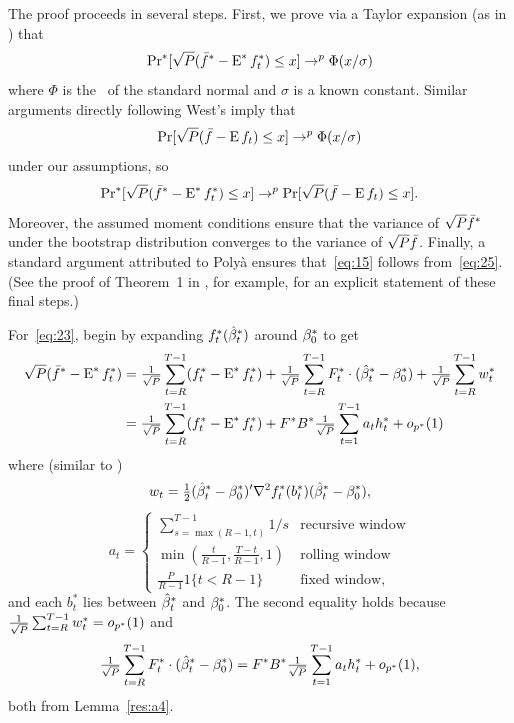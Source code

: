 \documentclass[12pt,fleqn]{article}
\begin{document}
The proof proceeds in several steps. First, we prove via a Taylor
expansion (as in \citealp{Wes:96}) that
\begin{equation}\label{eq:23}
  \operatorname{Pr}^*[\sqrt{P} (\bar f^* - \operatorname{E}^* f_t^*) \leq x] \to^p \Phi(x / \sigma)
\end{equation}
where $\Phi$ is the \cdf\ of the standard normal and $\sigma$ is a known
constant. Similar arguments directly following West's imply that
\begin{equation}\label{eq:24}
  \operatorname{Pr}[\sqrt{P} (\bar f - \operatorname{E} f_t) \leq x] \to^p \Phi(x / \sigma)
\end{equation}
under our assumptions, so
\begin{equation}\label{eq:25}
  \operatorname{Pr}^*[\sqrt{P} (\bar f^* - \operatorname{E}^* f_t^*) \leq x] \to^p
  \operatorname{Pr}[\sqrt{P} (\bar f - \operatorname{E} f_t) \leq x].
\end{equation}
Moreover, the assumed moment conditions ensure that the variance of
$\sqrt{P} \bar f^*$ under the bootstrap distribution converges to the
variance of $\sqrt{P} \bar f$. Finally, a standard argument attributed
to Poly{\`a} ensures that~\eqref{eq:15} follows
from~\eqref{eq:25}. (See the proof of Theorem~1 in \citealp{Cal:14},
for example, for an explicit statement of these final steps.)

For~\eqref{eq:23}, begin by expanding $f_t^{*}(\hat \beta_t^*)$ around
$\beta_0^*$ to get
  \begin{align*}
    \sqrt{P} (\bar f^* - \operatorname{E}^* f_t^*)
    &= \tfrac{1}{\sqrt{P}} \sum_{t=R}^{T-1} (f_t^{*} - \operatorname{E}^* f_t^*)
     + \tfrac{1}{\sqrt{P}} \sum_{t=R}^{T-1} F_t^* \cdot (\hat \beta_t^* - \beta_0^*)
     + \tfrac{1}{\sqrt{P}} \sum_{t=R}^{T-1} w_t^* \\
    &= \tfrac{1}{\sqrt{P}} \sum_{t=R}^{T-1} (f_t^{*} - \operatorname{E}^* f_t^*)
     + F^* B^* \tfrac{1}{\sqrt{P}} \sum_{t=1}^{T-1} a_t h_t^* + o_{p^*}(1)
  \end{align*}
  where (similar to \citealp{Wes:96})
  \begin{equation*}
    w_{t} = \tfrac12 (\hat \beta_t^* - \beta_0^*)' \nabla^2 f_{t}^*(b_{t}^*) (\hat \beta_t^* - \beta_0^*),
  \end{equation*}
  \begin{equation}\label{eq:1}
    a_t =
    \begin{cases}
      \sum_{s=\max(R-1, t)}^{T-1} 1/s & \text{recursive window} \\
      \min(\tfrac{t}{R-1}, \tfrac{T - t}{R-1}, 1) & \text{rolling window} \\
      \tfrac{P}{R-1} 1\{t < R-1\} &  \text{fixed window},
    \end{cases}
  \end{equation}
  and each $b_{t}^*$ lies between $\hat \beta_t^*$ and $\beta_0^*$. The second equality holds because
  $\tfrac{1}{\sqrt{P}} \sum_{t=R}^{T-1} w_t^* = o_{p^*}(1)$ and
  \begin{equation*}
    \tfrac{1}{\sqrt{P}} \sum_{t=R}^{T-1} F_t^* \cdot (\hat \beta_t^* - \beta_0^*)
    = F^* B^* \tfrac{1}{\sqrt{P}} \sum_{t=1}^{T-1} a_t h_t^* + o_{p^*}(1),
  \end{equation*}
  both from Lemma~\ref{res:a4}.
\end{document}

